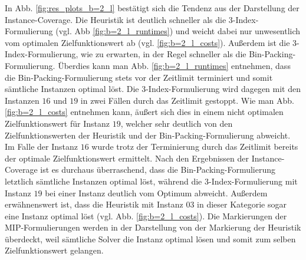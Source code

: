 In Abb. \ref{fig:res_plots_b=2_l} bestätigt sich die Tendenz aus der Darstellung der Instance-Coverage.
Die Heuristik ist deutlich schneller als die 3-Index-Formulierung (vgl. Abb \ref{fig:b=2_l_runtimes}) und weicht dabei nur
unwesentlich vom optimalen Zielfunktionswert ab (vgl. \ref{fig:b=2_l_costs}). Außerdem ist die 3-Index-Formulierung, wie zu erwarten,
in der Regel schneller als die Bin-Packing-Formulierung.
Überdies kann man Abb. \ref{fig:b=2_l_runtimes} entnehmen, dass die Bin-Packing-Formulierung stets vor der Zeitlimit terminiert
und somit sämtliche Instanzen optimal löst. Die 3-Index-Formulierung wird dagegen mit den Instanzen $16$ und $19$ in zwei
Fällen durch das Zeitlimit gestoppt. Wie man Abb. \ref{fig:b=2_l_costs} entnehmen kann, äußert sich dies in einem nicht optimalen Zielfunktionswert für Instanz $19$, welcher sehr deutlich von den Zielfunktionswerten der Heuristik und der Bin-Packing-Formulierung abweicht. Im Falle der Instanz $16$ wurde trotz der Terminierung durch das Zeitlimit bereits der optimale Zielfunktionswert ermittelt.
Nach den Ergebnissen der Instance-Coverage ist es durchaus überraschend, dass die Bin-Packing-Formulierung letztlich sämtliche Instanzen optimal löst, während die 3-Index-Formulierung mit Instanz $19$ bei einer Instanz deutlich vom Optimum abweicht. Außerdem erwähnenswert ist, dass die Heuristik mit Instanz $03$ in dieser Kategorie sogar eine Instanz optimal löst (vgl. Abb. \ref{fig:b=2_l_costs}). Die Markierungen der MIP-Formulierungen werden in der Darstellung von der Markierung der Heuristik überdeckt, weil sämtliche Solver die Instanz optimal lösen und somit zum selben Zielfunktionswert gelangen.

